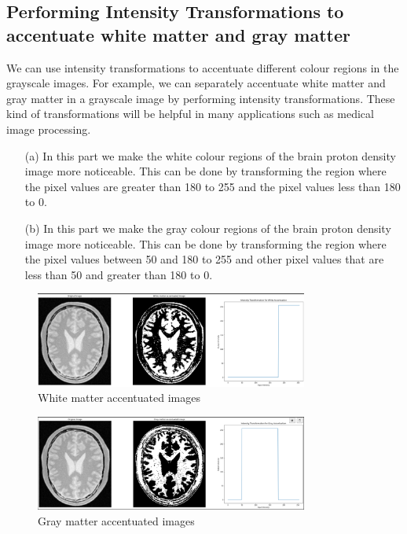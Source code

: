 \documentclass[11pt]{article}
\begin{document}
\begin{flushleft}
\section{Performing Intensity Transformations to accentuate white matter and gray matter}
We can use intensity transformations to accentuate different colour regions in the grayscale images. For example, we can separately accentuate white matter and gray matter in a grayscale image by performing intensity transformations. These kind of transformations will be helpful in many applications such as medical image processing.
\begin{itemize}
    \item[(a)] In this part we make the white colour regions of the brain proton density image more noticeable. This can be done by transforming the region where the pixel values are greater than 180 to 255 and the pixel values less than 180 to 0. 
    \item[(b)] In this part we make the gray colour regions of the brain proton density image more noticeable. This can be done by transforming the region where the pixel values between 50 and 180 to 255 and other pixel values that are less than 50 and greater than 180 to 0.
\end{itemize}
\hspace{-3cm}
\begin{figure}[htp]
    \centering
    \includegraphics[width=0.8\textwidth]{whitematter.png}
    \caption{White matter accentuated images}
\end{figure}
\vspace*{-2cm}
\begin{figure}[htp]
    \centering
    \includegraphics[width=0.8\textwidth]{graymatter.png}
    \caption{Gray matter accentuated images}
\end{figure}
\vspace*{-2cm}
\newpage
\vspace*{-1cm}
\hspace*{-3.6cm}

\end{flushleft}
\end{document}
